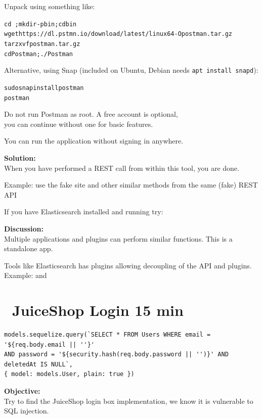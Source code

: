 \documentclass[a4paper,11pt,notitlepage]{report}
\begin{document}
Unpack using something like:
\begin{alltt}
cd ~;mkdir -p bin;cd bin
wget https://dl.pstmn.io/download/latest/linux64 -O postman.tar.gz
tar zxvf postman.tar.gz
cd Postman;./Postman
\end{alltt}

Alternative, using Snap (included on Ubuntu, Debian needs \verb+apt install snapd+):
\begin{alltt}
sudo snap install postman
postman
\end{alltt}

Do not run Postman as root. A free account is optional,\\
you can continue without one for basic features.

You can run the application without signing in anywhere.

{\bf Solution:}\\
When you have performed a REST call from within this tool, you are done.

Example: use the fake site  and other similar methods from the same (fake) REST API

If you have Elasticsearch installed and running try: 

{\bf Discussion:}\\
Multiple applications and plugins can perform similar functions. This is a standalone app.

Tools like Elasticsearch has plugins allowing decoupling of the API and plugins. Example:  and 


\chapter{\faExclamationTriangle\ JuiceShop Login 15 min}
\label{ex:juice-shop-login}

\begin{verbatim}
models.sequelize.query(`SELECT * FROM Users WHERE email = '${req.body.email || ''}'
AND password = '${security.hash(req.body.password || '')}' AND deletedAt IS NULL`,
{ model: models.User, plain: true })
\end{verbatim}

{\bf Objective:}\\
Try to find the JuiceShop login box implementation, we know it is vulnerable to SQL injection.
\end{document}
